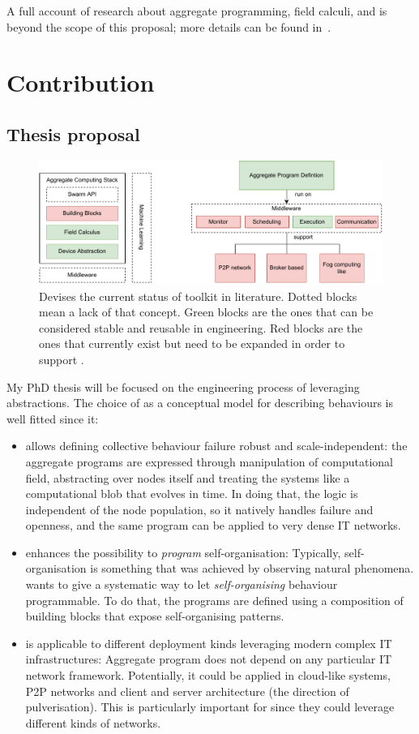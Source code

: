 \documentclass[11pt]{article}
\begin{document}
A full account of research about aggregate programming, field calculi, and \scafi{} is beyond the scope of this proposal; more details can be found in~\cite{viroli2019jlamp-si-coord,DBLP:journals/eaai/CasadeiVAPD21}.

\section{Contribution} \label{contribution}
\subsection{Thesis proposal}
\begin{figure}
	\centering
	\includegraphics[width=\textwidth]{img/to-do-for-thesis.pdf}
	\caption{Devises the current status of \ac{} toolkit in literature. Dotted blocks mean a lack of that concept. Green blocks are the ones that can be considered stable and reusable in \cpsw{} engineering. Red blocks are the ones that currently exist but need to be expanded in order to support \cpsw{}.}
	\label{fig:current-state}
\end{figure}
My PhD thesis will be focused on the engineering process of \cpsw{} leveraging \ac{} abstractions. The choice of \ac{} as a conceptual model for describing \cpsw{} behaviours is well fitted since it:
\begin{itemize}
	\item allows defining collective behaviour failure robust and scale-independent: the aggregate programs are expressed through manipulation of computational field, abstracting over nodes itself and treating the systems like a computational blob that evolves in time. In doing that, the logic is independent of the node population, so it natively handles failure and openness, and the same program can be applied to very dense IT networks.
	\item enhances the possibility to \textit{program} self-organisation: Typically, self-organisation is something that was achieved by observing natural phenomena. \ac{} wants to give a systematic way to let \textit{self-organising} behaviour programmable. To do that, the programs are defined using a composition of building blocks that expose self-organising patterns.
	\item is applicable to different deployment kinds leveraging modern complex IT infrastructures: Aggregate program does not depend on any particular IT network framework. Potentially, it could be applied in cloud-like systems, P2P networks and client and server architecture (the direction of pulverisation). This is particularly important for \cpsw{} since they could leverage different kinds of networks.
\end{itemize}
\end{document}
